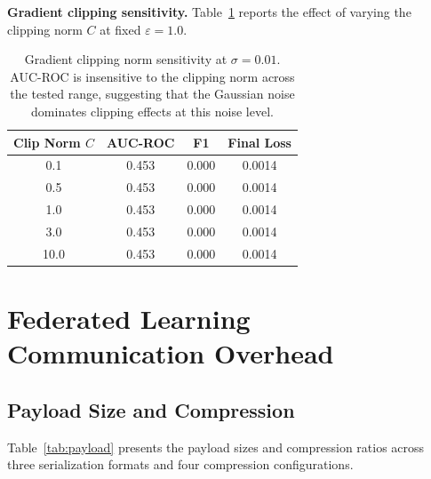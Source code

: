\textbf{Gradient clipping sensitivity.} Table~\ref{tab:clip_norm} reports the
effect of varying the clipping norm $C$ at fixed $\varepsilon = 1.0$.

\begin{table}[H]
    \centering
    \begin{tabular}{|c|c|c|c|}
        \hline
        \textbf{Clip Norm $C$} & \textbf{AUC-ROC} & \textbf{F1} &
        \textbf{Final Loss} \\
        \hline
        0.1 & 0.453 & 0.000 & 0.0014 \\
        \hline
        0.5 & 0.453 & 0.000 & 0.0014 \\
        \hline
        1.0 & 0.453 & 0.000 & 0.0014 \\
        \hline
        3.0 & 0.453 & 0.000 & 0.0014 \\
        \hline
        10.0 & 0.453 & 0.000 & 0.0014 \\
        \hline
    \end{tabular}
    \caption{Gradient clipping norm sensitivity at $\sigma = 0.01$.
             AUC-ROC is insensitive to the clipping norm across the tested
             range, suggesting that the Gaussian noise dominates clipping
             effects at this noise level.}
    \label{tab:clip_norm}
\end{table}

\section{Federated Learning Communication Overhead}
\label{sec:eval_fl_comm}

\subsection{Payload Size and Compression}
\label{subsec:eval_compression}

Table~\ref{tab:payload} presents the payload sizes and compression ratios
across three serialization formats and four compression configurations.

